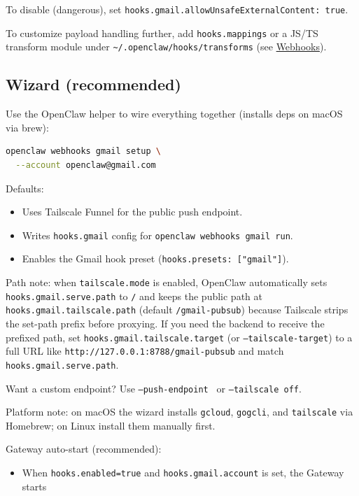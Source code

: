 To disable (dangerous), set \texttt{hooks.gmail.allowUnsafeExternalContent: true}.

To customize payload handling further, add \texttt{hooks.mappings} or a JS/TS transform module
under \texttt{\textasciitilde{}/.openclaw/hooks/transforms} (see \href{/automation/webhook}{Webhooks}).

\subsection{Wizard (recommended)}


Use the OpenClaw helper to wire everything together (installs deps on macOS via brew):

\begin{lstlisting}[language=bash]
openclaw webhooks gmail setup \
  --account openclaw@gmail.com
\end{lstlisting}


Defaults:

\begin{itemize}
  \item Uses Tailscale Funnel for the public push endpoint.
  \item Writes \texttt{hooks.gmail} config for \texttt{openclaw webhooks gmail run}.
  \item Enables the Gmail hook preset (\texttt{hooks.presets: ["gmail"]}).
\end{itemize}


Path note: when \texttt{tailscale.mode} is enabled, OpenClaw automatically sets
\texttt{hooks.gmail.serve.path} to \texttt{/} and keeps the public path at
\texttt{hooks.gmail.tailscale.path} (default \texttt{/gmail-pubsub}) because Tailscale
strips the set-path prefix before proxying.
If you need the backend to receive the prefixed path, set
\texttt{hooks.gmail.tailscale.target} (or \texttt{--tailscale-target}) to a full URL like
\texttt{http://127.0.0.1:8788/gmail-pubsub} and match \texttt{hooks.gmail.serve.path}.

Want a custom endpoint? Use \texttt{--push-endpoint } or \texttt{--tailscale off}.

Platform note: on macOS the wizard installs \texttt{gcloud}, \texttt{gogcli}, and \texttt{tailscale}
via Homebrew; on Linux install them manually first.

Gateway auto-start (recommended):

\begin{itemize}
  \item When \texttt{hooks.enabled=true} and \texttt{hooks.gmail.account} is set, the Gateway starts
\end{itemize}

